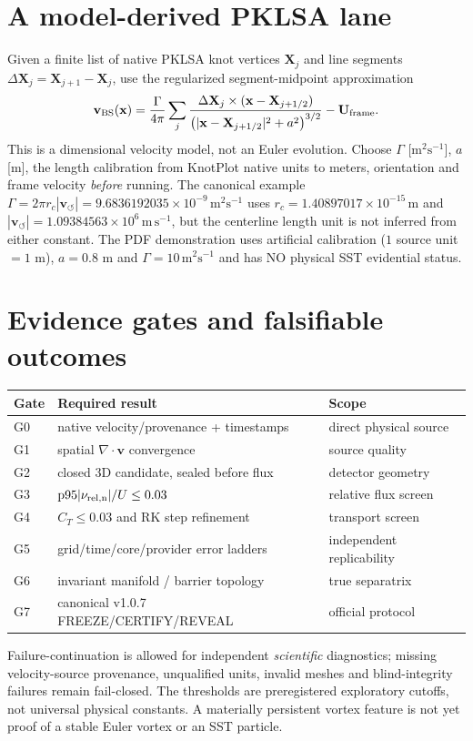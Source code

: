 \documentclass[11pt,a4paper]{article}
\newcommand{\vswirl}{\mathbf{v}_{\!\boldsymbol{\circlearrowleft}}}
\begin{document}
\section{A model-derived PKLSA lane}
Given a finite list of native PKLSA knot vertices $\mathbf X_j$ and line segments $\Delta\mathbf X_j=\mathbf X_{j+1}-\mathbf X_j$, use the regularized segment-midpoint approximation
\begin{equation}
\mathbf v_{\rm BS}(\mathbf x)=\frac{\Gamma}{4\pi}\sum_j
\frac{\Delta\mathbf X_j\times(\mathbf x-\mathbf X_{j+1/2})}
{\big(|\mathbf x-\mathbf X_{j+1/2}|^2+a^2\big)^{3/2}}-\mathbf U_\mathrm{frame}.
\end{equation}
This is a dimensional velocity model, not an Euler evolution. Choose $\Gamma$ [$\mathrm{m^2s^{-1}}$], $a$ [m], the length calibration from KnotPlot native units to meters, orientation and frame velocity \emph{before} running. The canonical example $\Gamma=2\pi r_c |\vswirl|=9.6836192035\times10^{-9}\,\mathrm{m^2s^{-1}}$ uses $r_c=1.40897017\times10^{-15}\,\mathrm m$ and $|\vswirl|=1.09384563\times10^{6}\,\mathrm{m\,s^{-1}}$, but the centerline length unit is not inferred from either constant. The PDF demonstration uses artificial calibration ($1$ source unit $=1$ m), $a=0.8$ m and $\Gamma=10\,\mathrm{m^2s^{-1}}$ and has NO physical SST evidential status.

\section{Evidence gates and falsifiable outcomes}
\begin{center}\small\begin{tabular}{lll}\toprule
Gate & Required result & Scope\\\midrule
G0 & native velocity/provenance + timestamps & direct physical source\\
G1 & spatial $\nabla\cdot\mathbf v$ convergence & source quality\\
G2 & closed 3D candidate, sealed before flux & detector geometry\\
G3 & $\mathrm{p95}|\nu_{\rm rel,n}|/U\le 0.03$ & relative flux screen\\
G4 & $C_T\le 0.03$ and RK step refinement & transport screen\\
G5 & grid/time/core/provider error ladders & independent replicability\\
G6 & invariant manifold / barrier topology & true separatrix\\
G7 & canonical v1.0.7 FREEZE/CERTIFY/REVEAL & official protocol\\\bottomrule
\end{tabular}\end{center}
Failure-continuation is allowed for independent \emph{scientific} diagnostics; missing velocity-source provenance, unqualified units, invalid meshes and blind-integrity failures remain fail-closed. The thresholds are preregistered exploratory cutoffs, not universal physical constants. A materially persistent vortex feature is not yet proof of a stable Euler vortex or an SST particle.
\end{document}
